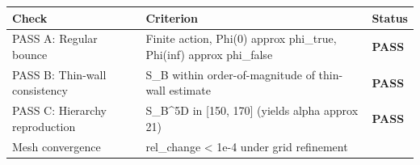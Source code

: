 \documentclass[
  11pt,
]{article}
\begin{document}
\begin{longtable}[]{@{}lll@{}}
\toprule
\begin{minipage}[b]{0.30\columnwidth}\raggedright
Check\strut
\end{minipage} & \begin{minipage}[b]{0.30\columnwidth}\raggedright
Criterion\strut
\end{minipage} & \begin{minipage}[b]{0.30\columnwidth}\raggedright
Status\strut
\end{minipage}\tabularnewline
\midrule
\endhead
\begin{minipage}[t]{0.30\columnwidth}\raggedright
PASS A: Regular bounce\strut
\end{minipage} & \begin{minipage}[t]{0.30\columnwidth}\raggedright
Finite action, Phi(0) approx phi\_true, Phi(inf) approx phi\_false\strut
\end{minipage} & \begin{minipage}[t]{0.30\columnwidth}\raggedright
\textbf{PASS}\strut
\end{minipage}\tabularnewline
\begin{minipage}[t]{0.30\columnwidth}\raggedright
PASS B: Thin-wall consistency\strut
\end{minipage} & \begin{minipage}[t]{0.30\columnwidth}\raggedright
S\_B within order-of-magnitude of thin-wall estimate\strut
\end{minipage} & \begin{minipage}[t]{0.30\columnwidth}\raggedright
\textbf{PASS}\strut
\end{minipage}\tabularnewline
\begin{minipage}[t]{0.30\columnwidth}\raggedright
PASS C: Hierarchy reproduction\strut
\end{minipage} & \begin{minipage}[t]{0.30\columnwidth}\raggedright
S\_B\^{}5D in {[}150, 170{]} (yields alpha approx 21)\strut
\end{minipage} & \begin{minipage}[t]{0.30\columnwidth}\raggedright
\textbf{PASS}\strut
\end{minipage}\tabularnewline
\begin{minipage}[t]{0.30\columnwidth}\raggedright
Mesh convergence\strut
\end{minipage} & \begin{minipage}[t]{0.30\columnwidth}\raggedright
rel\_change \textless{} 1e-4 under grid refinement\strut

\end{minipage}
\end{longtable}
\end{document}
